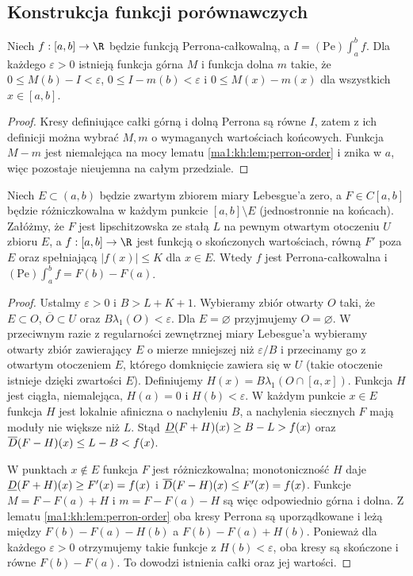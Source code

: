 \subsection*{Konstrukcja funkcji porównawczych}
\begin{lemat}\label{lem:perron-scisle}
Niech $f:[a,b]\to\R$ będzie funkcją Perrona-całkowalną, a $I=(\mathrm{Pe})\int_a^b f$. Dla każdego $\varepsilon>0$ istnieją funkcja górna $M$ i funkcja dolna $m$ takie, że
$0\le M(b)-I<\varepsilon$, $0\le I-m(b)<\varepsilon$ i $0\le M(x)-m(x)$ dla wszystkich $x\in[a,b]$.
\end{lemat}
\begin{proof}
Kresy definiujące całki górną i dolną Perrona są równe $I$, zatem z ich definicji można wybrać $M,m$ o wymaganych wartościach końcowych. Funkcja $M-m$ jest niemalejąca na mocy lematu \ref{ma1:kh:lem:perron-order} i znika w $a$, więc pozostaje nieujemna na całym przedziale.
\end{proof}
\begin{twierdzenie}\label{tw:perron-wyjatki}
Niech $E\subset(a,b)$ będzie zwartym zbiorem miary Lebesgue'a zero, a $F\in C[a,b]$ będzie różniczkowalna w każdym punkcie $[a,b]\setminus E$ (jednostronnie na końcach). Załóżmy, że $F$ jest lipschitzowska ze stałą $L$ na pewnym otwartym otoczeniu $U$ zbioru $E$, a $f:[a,b]\to\R$ jest funkcją o skończonych wartościach, równą $F'$ poza $E$ oraz spełniającą $|f(x)|\le K$ dla $x\in E$. Wtedy $f$ jest Perrona-całkowalna i
$(\mathrm{Pe})\int_a^b f=F(b)-F(a)$.
\end{twierdzenie}
\begin{proof}
Ustalmy $\varepsilon>0$ i $B>L+K+1$. Wybieramy zbiór otwarty $O$ taki, że $E\subset O$, $\overline O\subset U$ oraz $B\lambda_1(O)<\varepsilon$. Dla $E=\varnothing$ przyjmujemy $O=\varnothing$. W przeciwnym razie z regularności zewnętrznej miary Lebesgue'a wybieramy otwarty zbiór zawierający $E$ o mierze mniejszej niż $\varepsilon/B$ i przecinamy go z otwartym otoczeniem $E$, którego domknięcie zawiera się w $U$ (takie otoczenie istnieje dzięki zwartości $E$). Definiujemy $H(x)=B\lambda_1(O\cap[a,x])$. Funkcja $H$ jest ciągła, niemalejąca, $H(a)=0$ i $H(b)<\varepsilon$. W każdym punkcie $x\in E$ funkcja $H$ jest lokalnie afiniczna o nachyleniu $B$, a nachylenia siecznych $F$ mają moduły nie większe niż $L$. Stąd $\underline D(F+H)(x)\ge B-L>f(x)$ oraz $\overline D(F-H)(x)\le L-B<f(x)$.

W punktach $x\notin E$ funkcja $F$ jest różniczkowalna; monotoniczność $H$ daje $\underline D(F+H)(x)\ge F'(x)=f(x)$ i $\overline D(F-H)(x)\le F'(x)=f(x)$. Funkcje $M=F-F(a)+H$ i $m=F-F(a)-H$ są więc odpowiednio górna i dolna. Z lematu \ref{ma1:kh:lem:perron-order} oba kresy Perrona są uporządkowane i leżą między $F(b)-F(a)-H(b)$ a $F(b)-F(a)+H(b)$. Ponieważ dla każdego $\varepsilon>0$ otrzymujemy takie funkcje z $H(b)<\varepsilon$, oba kresy są skończone i równe $F(b)-F(a)$. To dowodzi istnienia całki oraz jej wartości.
\end{proof}
